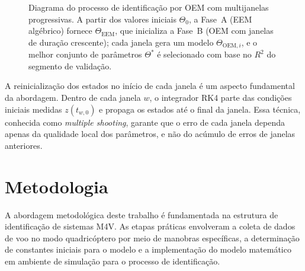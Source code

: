 \documentclass[letterpaper, 10 pt, conference]{ieeeconf}
\begin{document}
\begin{figure}[htbp]
{%
}
\caption{Diagrama do processo de identifica\c{c}\~ao por OEM com multijanelas progressivas. A partir dos valores iniciais $\Theta_0$, a Fase~A (EEM alg\'ebrico) fornece $\Theta_{\text{EEM}}$, que inicializa a Fase~B (OEM com janelas de dura\c{c}\~ao crescente); cada janela gera um modelo $\Theta_{\text{OEM},i}$, e o melhor conjunto de par\^ametros $\Theta^*$ \'e selecionado com base no $R^2$ do segmento de valida\c{c}\~ao.}
\label{fig:oem_diagram}
\end{figure}

A reinicialização dos estados no início de cada janela é um aspecto fundamental da abordagem. Dentro de cada janela $w$, o integrador RK4 parte das condições iniciais medidas $z(t_{w,0})$ e propaga os estados até o final da janela. Essa técnica, conhecida como \textit{multiple shooting}, garante que o erro de cada janela dependa apenas da qualidade local dos parâmetros, e não do acúmulo de erros de janelas anteriores.

\section{Metodologia}

A abordagem metodológica deste trabalho é fundamentada na estrutura de identificação de sistemas M4V. As etapas práticas envolveram a coleta de dados de voo no modo quadricóptero por meio de manobras específicas, a determinação de constantes iniciais para o modelo e a implementação do modelo matemático em ambiente de simulação para o processo de identificação.
\end{document}
